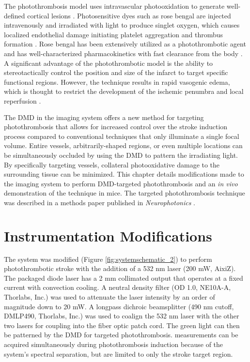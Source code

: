 The photothrombosis model uses intravascular photooxidation to generate well-defined cortical lesions \cite{Watson:1985bp}. Photosensitive dyes such as rose bengal are injected intravenously and irradiated with light to produce singlet oxygen, which causes localized endothelial damage initiating platelet aggregation and thrombus formation \cite{Dietrich:1987wh}. Rose bengal has been extensively utilized as a photothrombotic agent \cite{Grome:1988bx, Parthasarathy:2010vo} and has well-characterized pharmacokinetics with fast clearance from the body \cite{Klaassen:1976kg}. A significant advantage of the photothrombotic model is the ability to stereotactically control the position and size of the infarct to target specific functional regions. However, the technique results in rapid vasogenic edema, which is thought to restrict the development of the ischemic penumbra and local reperfusion \cite{Carmichael:2005gk}.

The DMD in the imaging system offers a new method for targeting photothrombosis that allows for increased control over the stroke induction process compared to conventional techniques that only illuminate a single focal volume. Entire vessels, arbitrarily-shaped regions, or even multiple locations can be simultaneously occluded by using the DMD to pattern the irradiating light. By specifically targeting vessels, collateral photooxidative damage to the surrounding tissue can be minimized. This chapter details modifications made to the imaging system to perform DMD-targeted photothrombosis and an \textit{in vivo} demonstration of the technique in mice. The targeted photothrombosis technique was described in a methods paper published in \textit{Neurophotonics} \cite{Sullender:2018ff}.



\section{Instrumentation Modifications}

The system was modified (Figure \ref{fig:systemschematic_2}) to perform photothrombotic stroke with the addition of a 532 nm laser (200 mW, AixiZ). The packaged diode laser has a 2 mm collimated output that operates at a fixed current with convection cooling. A neutral density filter (OD 1.0, NE10A-A, Thorlabs, Inc.) was used to attenuate the laser intensity by an order of magnitude down to 20 mW. A longpass dichroic beamsplitter (490 nm cutoff, DMLP490, Thorlabs, Inc.) was used to coalign the 532 nm laser with the other two lasers for coupling into the fiber optic patch cord. The green light can then be patterned by the DMD for targeted photothrombosis.  measurements can be acquired simultaneously during photothrombosis induction because of the system's spectral separation, but are limited to only the stroke target region.

